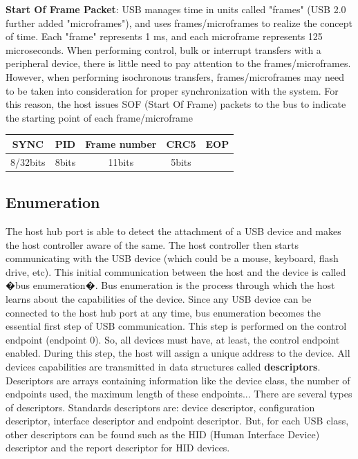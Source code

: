\documentclass[pdftex,10pt,a4paper]{report}
\newenvironment{packed_item}{
\begin{itemize}
  \setlength{\itemsep}{1pt}
  \setlength{\parskip}{0pt}
  \setlength{\parsep}{0pt}
}{\end{itemize}}
\begin{document}
\begin{packed_item}
  	
	\item \textbf{Start Of Frame Packet}: USB manages time in units called "frames" (USB 2.0 further added "microframes"), and uses frames/microframes to realize the concept of time. Each "frame" represents 1 ms, and each microframe represents 125 microseconds. When performing control, bulk or interrupt transfers with a peripheral device, there is little need to pay attention to the frames/microframes. However, when performing isochronous transfers, frames/microframes may need to be taken into consideration for proper synchronization with the system. For this reason, the host issues SOF (Start Of Frame) packets to the bus to indicate the starting point of each frame/microframe
	
		\begin{center}
		\begin{tabular}{|c|c|c|c|c|}
  	\hline
  		SYNC & PID & Frame number & CRC5 & EOP \\ \hline
  		8/32bits & 8bits & 11bits & 5bits &   \\
  	\hline
  	\end{tabular}
  	\end{center}
  	
\end{packed_item}


\subsection{Enumeration}
The host hub port is able to detect the attachment of a USB device and makes the host controller aware of the same. The host controller then starts communicating with the USB device (which could be a mouse, keyboard, flash drive, etc). This initial communication between the host and the device is called �bus enumeration�. Bus enumeration is the process through which the host learns about the capabilities of the device. Since any USB device can be connected to the host hub port at any time, bus enumeration becomes the essential first step of USB communication. This step is performed on the control endpoint (endpoint 0). So, all devices must have, at least, the control endpoint enabled.
During this step, the host will assign a unique address to the device.
All devices capabilities are transmitted in data structures called \textbf{descriptors}. Descriptors are arrays containing information like the device class, the number of endpoints used, the maximum length of these endpoints... There are several types of descriptors. Standards descriptors are: device descriptor, configuration descriptor, interface descriptor and endpoint descriptor. But, for each USB class, other descriptors can be found such as the HID (Human Interface Device) descriptor and the report descriptor for HID devices.
\end{document}

